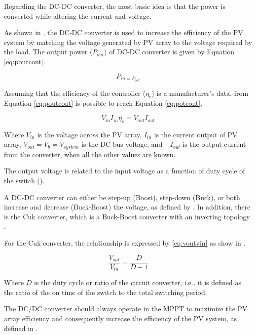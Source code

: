 \documentclass[journal]{IEEEtran}
\begin{document}
Regarding the DC-DC converter, the most basic idea is that the power is converted while altering the current and voltage. 

As shown in \cite{Abdulateef}, the DC-DC converter is used to increase the efficiency of the PV system by matching the voltage generated by PV array to the voltage required by the load. The output power ($ P_{out} $) of DC-DC converter is given by Equation \ref{eq:poutcont}. 

\begin{equation}
\label{eq:poutcont}
P_{in = P_{out}}
\end{equation}

Assuming that the efficiency of the controller ($ \eta_{c} $) is a manufacturer's data, from Equation \ref{eq:poutcont} is possible to reach Equation \ref{eq:potcont}.

\begin{equation}
\label{eq:potcont}
V_{in} I_{in} \eta_{c} = V_{out} I_{out}
\end{equation}

Where $ V_{in} $ is the voltage across the PV array, $ I_{in} $ is the current output of PV array, $ V_{out}=V_{b}=V_{system} $ is the  DC bus voltage, and $-I_{out}$ is the output current from the converter, when all the other values are known.

The output voltage is related to the input voltage as a function of duty cycle of the switch (\cite{Abdulateef}). 
 
A DC-DC converter can either be step-up (Boost), step-down (Buck), or both increase and decrease (Buck-Boost) the voltage, as defined by \cite{Mahanta}. In addition, there is the Cuk converter, which is a Buck-Boost converter with an inverting topology \cite{Catherine}. 

For the Cuk converter, the relationship is expressed by \ref{eq:voutvin} as show in \cite{Abdulateef}.

\begin{equation}
\label{eq:voutvin}
\dfrac{V_{out}}{V_{in}} = \dfrac{D}{D-1}
\end{equation}

Where $D$ is the duty cycle or ratio of the circuit converter, i.e., it is defined as the ratio of the on time of the switch to the total switching period.
 
The DC/DC converter should always operate in the MPPT to maximize the PV array efficiency and consequently increase the efficiency of the PV system, as defined in \cite{Yatimi}.
  
\end{document}
